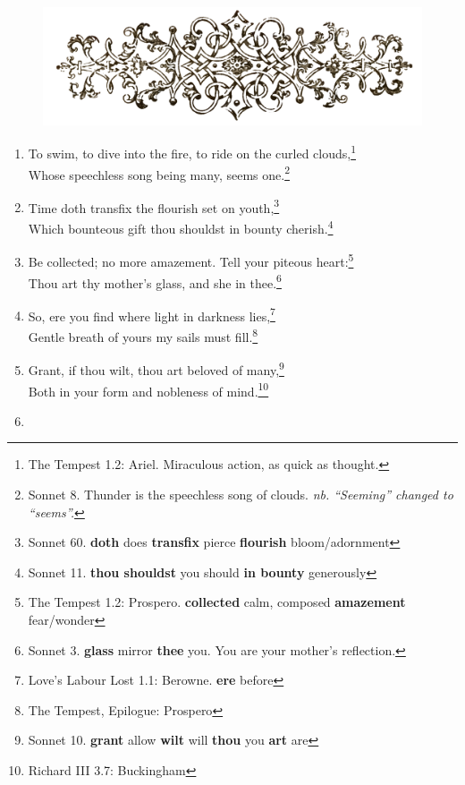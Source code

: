 \documentclass[17pt,twoside]{extarticle}
\begin{document}
\thispagestyle{empty}

\begin{figure}[htbp]
\centering
\includegraphics[width=15.5cm]{images/frontispiece.png}
\end{figure}

\begin{enumerate}
\item
  To swim, to dive into the fire, to ride on the curled
  clouds,\footnote{The Tempest 1.2: Ariel. Miraculous action, as quick
    as thought.}\\Whose speechless song being many, seems one.\footnote{Sonnet
    8. Thunder is the speechless song of clouds. \emph{nb. ``Seeming''
    changed to ``seems''.}}
\item
  Time doth transfix the flourish set on youth,\footnote{Sonnet 60.
    \textbf{doth} does \textbf{transfix} pierce \textbf{flourish}
    bloom/adornment}\\Which bounteous gift thou shouldst in bounty
  cherish.\footnote{Sonnet 11. \textbf{thou shouldst} you should
    \textbf{in bounty} generously}
\item
  Be collected; no more amazement. Tell your piteous heart:\footnote{The
    Tempest 1.2: Prospero. \textbf{collected} calm, composed
    \textbf{amazement} fear/wonder}\\Thou art thy mother's glass, and
  she in thee.\footnote{Sonnet 3. \textbf{glass} mirror \textbf{thee}
    you. You are your mother's reflection.}
\item
  So, ere you find where light in darkness lies,\footnote{Love's Labour
    Lost 1.1: Berowne. \textbf{ere} before}\\Gentle breath of yours my
  sails must fill.\footnote{The Tempest, Epilogue: Prospero}
\item
  Grant, if thou wilt, thou art beloved of many,\footnote{Sonnet 10.
    \textbf{grant} allow \textbf{wilt} will \textbf{thou} you
    \textbf{art} are}\\Both in your form and nobleness of
  mind.\footnote{Richard III 3.7: Buckingham}
\item

\end{enumerate}
\end{document}
